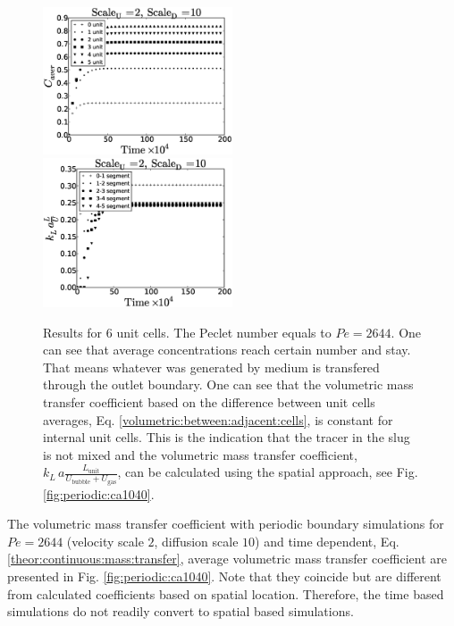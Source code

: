 \documentclass{article}
\newcommand{\vol}{k_L\,a}
\newcommand{\lunit}{L_{\mathrm{unit}}}
\newcommand{\ububble}{U_{\mathrm{bubble}}}
\newcommand{\ugas}{U_{\mathrm{gas}}}
\newcommand{\volnondim}{\vol \frac{\lunit}{\ububble+\ugas}}
\begin{document}
\begin{figure}[htb!]
\includegraphics[width=0.5\textwidth]{Figures/aver_units6scaleu2scaled5.eps}
\includegraphics[width=0.5\textwidth]{Figures/novortex6scaleu2scaled5.eps}\\
\caption{Results for 6 unit cells. The Peclet number equals to $Pe=2644$.
One can see that average concentrations reach certain number and stay.
That means whatever was
generated by medium is transfered through the outlet
boundary. One can see that the volumetric mass transfer coefficient based
on the difference between unit cells averages, Eq. \ref{volumetric:between:adjacent:cells}, is
constant for internal
unit cells. This is the indication that the tracer in the slug is not
mixed and the volumetric mass transfer coefficient, $\volnondim$, can be
calculated using the spatial approach, see Fig.
\ref{fig:periodic:ca1040}.\label{fig:6:units:ca1040}}
\end{figure}
The volumetric mass transfer coefficient with periodic boundary simulations for $Pe=2644$ (velocity
scale $2$, diffusion scale $10$) and time dependent, Eq. \ref{theor:continuous:mass:transfer},
average volumetric mass transfer coefficient are presented in Fig. \ref{fig:periodic:ca1040}. Note
that they coincide but are different from calculated coefficients based on spatial location.
Therefore, the time based simulations do not readily convert to spatial based simulations.
\end{document}
